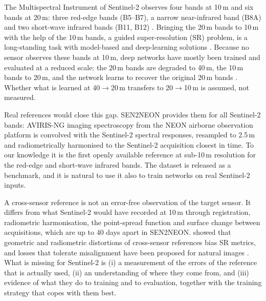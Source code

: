 \documentclass[pdflatex,sn-basic,referee,lineno]{sn-jnl}
\begin{document}
The Multispectral Instrument of Sentinel-2 observes four bands at 10\,m and six bands at 20\,m: three red-edge
bands (B5--B7), a narrow near-infrared band (B8A) and two short-wave infrared bands (B11, B12)
\citep{drusch2012sentinel2}. Bringing the 20\,m bands to 10\,m with the help of the 10\,m bands, a guided
super-resolution (SR) problem, is a long-standing task with model-based \citep{brodu2017supres} and deep-learning
solutions \citep{lanaras2018dsen2,aybar2026sen2sr}. Because no sensor observes these bands at 10\,m, deep networks
have mostly been trained and evaluated at a reduced scale: the 20\,m bands are degraded to 40\,m, the 10\,m bands to
20\,m, and the network learns to recover the original 20\,m bands \citep{wald1997fusion,lanaras2018dsen2}. Whether
what is learned at 40$\to$20\,m transfers to 20$\to$10\,m is assumed, not measured.

Real references would close this gap. SEN2NEON \citep{donike2026sen2neon} provides them for all Sentinel-2 bands:
AVIRIS-NG imaging spectroscopy from the NEON airborne observation platform \citep{hamlin2011aviris,kampe2010neon}
is convolved with the Sentinel-2 spectral responses, resampled to 2.5\,m and radiometrically harmonised to the
Sentinel-2 acquisition closest in time. To our knowledge it is the first openly available reference at sub-10\,m
resolution for the red-edge and short-wave infrared bands. The dataset is released as a benchmark, and it is
natural to use it also to train networks on real Sentinel-2 inputs.

A cross-sensor reference is not an error-free observation of the target sensor. It differs from what Sentinel-2 would have recorded at 10\,m through
registration, radiometric harmonisation, the point-spread function and surface change between acquisitions, which
are up to 40 days apart in SEN2NEON. \citet{michel2025revisiting} showed that geometric and radiometric distortions
of cross-sensor references bias SR metrics, and losses that tolerate misalignment have been proposed for natural
images \citep{mechrez2018contextual,zhang2019zoom,ni2024fdl,elezabi2024mimicked}. What is missing for Sentinel-2 is
(i) a measurement of the errors of the reference that is actually used, (ii) an understanding of where they come
from, and (iii) evidence of what they do to training and to evaluation, together with the training strategy that
copes with them best.
\end{document}
